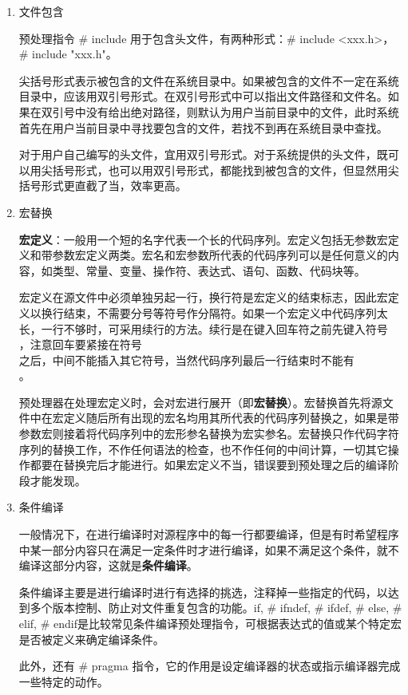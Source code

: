 \begin{enumerate}
\item 文件包含

预处理指令 \# include 用于包含头文件，有两种形式：\# include <xxx.h>，\# include "xxx.h"。

尖括号形式表示被包含的文件在系统目录中。如果被包含的文件不一定在系统目录中，应该用双引号形式。在双引号形式中可以指出文件路径和文件名。如果在双引号中没有给出绝对路径，则默认为用户当前目录中的文件，此时系统首先在用户当前目录中寻找要包含的文件，若找不到再在系统目录中查找。

对于用户自己编写的头文件，宜用双引号形式。对于系统提供的头文件，既可以用尖括号形式，也可以用双引号形式，都能找到被包含的文件，但显然用尖括号形式更直截了当，效率更高。

\item 宏替换

\textbf{宏定义}：一般用一个短的名字代表一个长的代码序列。宏定义包括无参数宏定义和带参数宏定义两类。宏名和宏参数所代表的代码序列可以是任何意义的内容，如类型、常量、变量、操作符、表达式、语句、函数、代码块等。

宏定义在源文件中必须单独另起一行，换行符是宏定义的结束标志，因此宏定义以换行结束，不需要分号等符号作分隔符。如果一个宏定义中代码序列太长，一行不够时，可采用续行的方法。续行是在键入回车符之前先键入符号\\，注意回车要紧接在符号\\之后，中间不能插入其它符号，当然代码序列最后一行结束时不能有\\。

预处理器在处理宏定义时，会对宏进行展开（即\textbf{宏替换}）。宏替换首先将源文件中在宏定义随后所有出现的宏名均用其所代表的代码序列替换之，如果是带参数宏则接着将代码序列中的宏形参名替换为宏实参名。宏替换只作代码字符序列的替换工作，不作任何语法的检查，也不作任何的中间计算，一切其它操作都要在替换完后才能进行。如果宏定义不当，错误要到预处理之后的编译阶段才能发现。

\item 条件编译

一般情况下，在进行编译时对源程序中的每一行都要编译，但是有时希望程序中某一部分内容只在满足一定条件时才进行编译，如果不满足这个条件，就不编译这部分内容，这就是\textbf{条件编译}。

条件编译主要是进行编译时进行有选择的挑选，注释掉一些指定的代码，以达到多个版本控制、防止对文件重复包含的功能。if, \# ifndef, \# ifdef, \# else, \# elif, \# endif是比较常见条件编译预处理指令，可根据表达式的值或某个特定宏是否被定义来确定编译条件。

此外，还有 \# pragma 指令，它的作用是设定编译器的状态或指示编译器完成一些特定的动作。
\end{enumerate}
